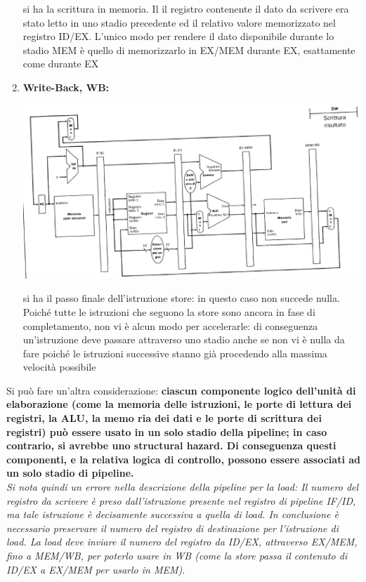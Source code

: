 \documentclass[a4paper,12pt, oneside]{book}
\begin{document}
\begin{enumerate}
\begin{center}
  \end{center}
  si ha la scrittura in memoria. Il il registro contenente il dato da
  scrivere era stato letto in uno stadio precedente ed il relativo
  valore memorizzato nel registro ID/EX. L'unico modo per rendere il
  dato disponibile durante lo stadio MEM è quello di memorizzarlo in
  EX/MEM durante EX, esattamente come durante EX
  \item \textbf{Write-Back, WB:}
  \begin{center}
    \includegraphics[scale = 0.7]{img/pipe11.png}
  \end{center}
  si ha il passo finale dell'istruzione store: in questo caso non
  succede nulla. Poiché tutte le istruzioni che seguono la store sono
  ancora in fase di completamento, non vi è alcun modo per
  accelerarle: di conseguenza un'istruzione deve passare attraverso
  uno stadio anche se non vi è nulla da fare poiché le istruzioni
  successive stanno già procedendo alla massima velocità possibile
\end{enumerate}
Si può fare un'altra considerazione: \textbf{ciascun componente logico
  dell'unità di elaborazione (come la memoria delle istruzioni,
  le porte di lettura dei registri, la ALU, la memo  ria dei dati
  e le porte di scrittura dei registri) può essere usato in un solo
  stadio della pipeline; in caso contrario, si avrebbe uno structural
  hazard. Di conseguenza questi componenti, e la relativa logica di
  controllo, possono essere associati ad un solo stadio di
  pipeline.}\\
\textit{Si nota quindi un errore nella descrizione della pipeline per
  la load: Il numero del registro da scrivere è preso dall'istruzione
  presente nel registro di pipeline IF/ID, ma tale istruzione
  è decisamente successiva a quella di load. In conclusione è
  necessario preservare il numero del registro di destinazione per
  l'istruzione di load. La load deve inviare il numero del registro da
  ID/EX, attraverso EX/MEM, fino a MEM/WB, per poterlo usare in WB
  (come la store passa il contenuto di ID/EX a EX/MEM per usarlo in
  MEM)}.\\
\end{document}
